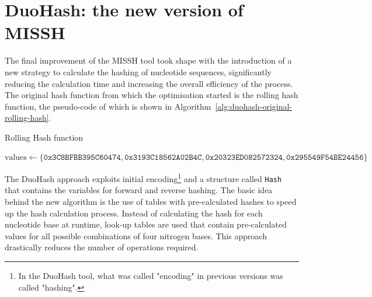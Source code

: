 \section{DuoHash: the new version of MISSH}
\label{sec:DuoHash}

The final improvement of the \acs{MISSH} tool took shape with the introduction of a new strategy to calculate the hashing of nucleotide sequences, significantly reducing the calculation time and increasing the overall efficiency of the process. The original hash function from which the optimisation started is the rolling hash function, the pseudo-code of which is shown in Algorithm~\ref{alg:duohash-original-rolling-hash}.

\begin{algorithm}[!ht]
	\caption{Rolling Hash function}
	\label{alg:duohash-original-rolling-hash}
	
	$\mathrm{values} \gets \{ \texttt{0x3C8BFBB395C60474}, \texttt{0x3193C18562A02B4C}, \allowbreak\texttt{0x20323ED082572324}, \texttt{0x295549F54BE24456} \}$\;
	
\end{algorithm}

The DuoHash approach exploits initial encoding\footnote{In the DuoHash tool, what was called "encoding" in previous versions was called "hashing".} and a structure called \verb|Hash| that contains the variables for forward and reverse hashing. The basic idea behind the new algorithm is the use of tables with pre-calculated hashes to speed up the hash calculation process. Instead of calculating the hash for each nucleotide base at runtime, look-up tables are used that contain pre-calculated values for all possible combinations of four nitrogen bases. This approach drastically reduces the number of operations required.


